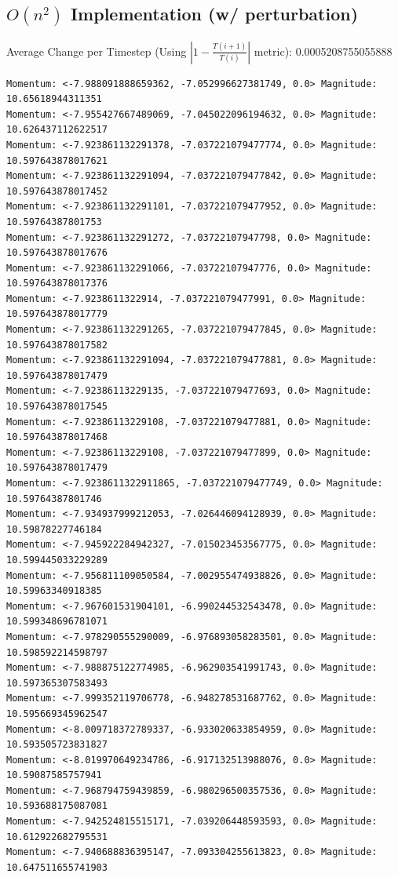 \documentclass[10pt]{article}
\begin{document}
\subsection{$O(n^2)$ Implementation (w/ perturbation)}
Average Change per Timestep (Using $|1 - \frac{T(i+1)}{T(i)}|$ metric): 0.0005208755055888
\footnotesize
\begin{verbatim}
Momentum: <-7.988091888659362, -7.052996627381749, 0.0> Magnitude: 10.65618944311351
Momentum: <-7.955427667489069, -7.045022096194632, 0.0> Magnitude: 10.626437112622517
Momentum: <-7.923861132291378, -7.037221079477774, 0.0> Magnitude: 10.597643878017621
Momentum: <-7.923861132291094, -7.037221079477842, 0.0> Magnitude: 10.597643878017452
Momentum: <-7.923861132291101, -7.037221079477952, 0.0> Magnitude: 10.59764387801753
Momentum: <-7.923861132291272, -7.03722107947798, 0.0> Magnitude: 10.597643878017676
Momentum: <-7.923861132291066, -7.03722107947776, 0.0> Magnitude: 10.597643878017376
Momentum: <-7.9238611322914, -7.037221079477991, 0.0> Magnitude: 10.597643878017779
Momentum: <-7.923861132291265, -7.037221079477845, 0.0> Magnitude: 10.597643878017582
Momentum: <-7.923861132291094, -7.037221079477881, 0.0> Magnitude: 10.597643878017479
Momentum: <-7.92386113229135, -7.037221079477693, 0.0> Magnitude: 10.597643878017545
Momentum: <-7.92386113229108, -7.037221079477881, 0.0> Magnitude: 10.597643878017468
Momentum: <-7.92386113229108, -7.037221079477899, 0.0> Magnitude: 10.597643878017479
Momentum: <-7.9238611322911865, -7.037221079477749, 0.0> Magnitude: 10.59764387801746
Momentum: <-7.934937999212053, -7.026446094128939, 0.0> Magnitude: 10.59878227746184
Momentum: <-7.945922284942327, -7.015023453567775, 0.0> Magnitude: 10.599445033229289
Momentum: <-7.956811109050584, -7.002955474938826, 0.0> Magnitude: 10.59963340918385
Momentum: <-7.967601531904101, -6.990244532543478, 0.0> Magnitude: 10.599348696781071
Momentum: <-7.978290555290009, -6.976893058283501, 0.0> Magnitude: 10.598592214598797
Momentum: <-7.988875122774985, -6.962903541991743, 0.0> Magnitude: 10.597365307583493
Momentum: <-7.999352119706778, -6.948278531687762, 0.0> Magnitude: 10.595669345962547
Momentum: <-8.009718372789337, -6.933020633854959, 0.0> Magnitude: 10.593505723831827
Momentum: <-8.019970649234786, -6.917132513988076, 0.0> Magnitude: 10.59087585757941
Momentum: <-7.968794759439859, -6.980296500357536, 0.0> Magnitude: 10.593688175087081
Momentum: <-7.942524815515171, -7.039206448593593, 0.0> Magnitude: 10.612922682795531
Momentum: <-7.940688836395147, -7.093304255613823, 0.0> Magnitude: 10.647511655741903

\end{verbatim}
\end{document}
